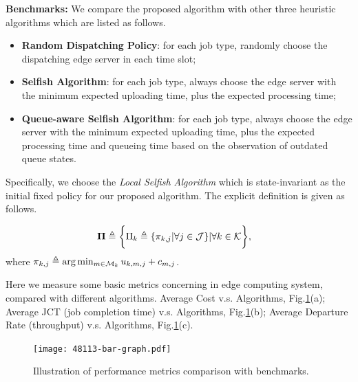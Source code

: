 \textbf{Benchmarks:}
We compare the proposed algorithm with other three heuristic algorithms which are listed as follows.
\begin{itemize}
    \item \textbf{Random Dispatching Policy}:
            for each job type, randomly choose the dispatching edge server in each time slot; 
    \item \textbf{Selfish Algorithm}:
            for each job type, always choose the edge server with the minimum expected uploading time, plus the expected processing time;
    \item \textbf{Queue-aware Selfish Algorithm}:
            for each job type, always choose the edge server with the minimum expected uploading time, plus the expected processing time and queueing time based on the observation of outdated queue states.
\end{itemize}
Specifically, we choose the \emph{Local Selfish Algorithm} which is state-invariant as the initial fixed policy for our proposed algorithm.
The explicit definition is given as follows.
\begin{policy}
    \begin{align}
        \boldsymbol{\Pi} &\triangleq \bigg\{ \Pi_{k}\triangleq\{\pi_{k,j}|\forall j\in\mathcal{J}\} |\forall k\in\mathcal{K} \bigg\},
    \end{align}
    where $\pi_{k,j} \triangleq \arg\min_{m\in\mathcal{M}_{k}} u_{k,m,j} + c_{m,j}$.
\end{policy}

Here we measure some basic metrics concerning in edge computing system, compared with different algorithms.
Average Cost v.s. Algorithms, Fig.\ref{fig:bar_plot}(a);
Average JCT (job completion time) v.s. Algorithms, Fig.\ref{fig:bar_plot}(b);
Average Departure Rate (throughput) v.s. Algorithms, Fig.\ref{fig:bar_plot}(c).

\begin{figure}[h]                                                       %
    \centering                                                          %
    \texttt{[image: 48113-bar-graph.pdf]}         %
    \caption{Illustration of performance metrics comparison with benchmarks.}
    \label{fig:bar_plot}                                                %
\end{figure}                                                            %

